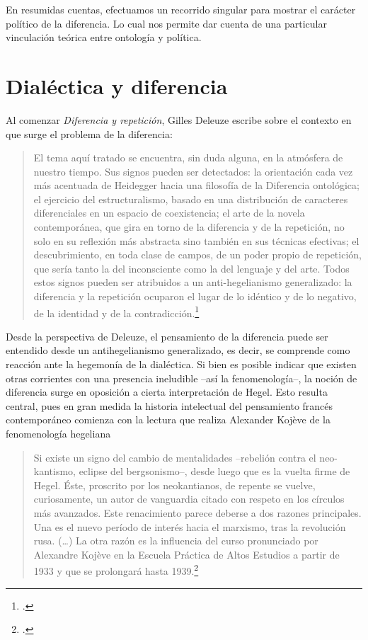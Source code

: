 En resumidas cuentas, efectuamos un recorrido singular para mostrar el
carácter político de la diferencia. Lo cual nos permite dar cuenta de
una particular vinculación teórica entre ontología y política.

\section{Dialéctica y diferencia}

Al comenzar \emph{Diferencia y repetición}, Gilles Deleuze escribe sobre
el contexto en que surge el problema de la diferencia:

\begin{quote}
El tema aquí tratado se encuentra, sin duda alguna, en la atmósfera de
nuestro tiempo. Sus signos pueden ser detectados: la orientación cada
vez más acentuada de Heidegger hacia una filosofía de la Diferencia
ontológica; el ejercicio del estructuralismo, basado en una distribución
de caracteres diferenciales en un espacio de coexistencia; el arte de la
novela contemporánea, que gira en torno de la diferencia y de la
repetición, no solo en su reflexión más abstracta sino también en sus
técnicas efectivas; el descubrimiento, en toda clase de campos, de un
poder propio de repetición, que sería tanto la del inconsciente como la
del lenguaje y del arte. Todos estos signos pueden ser atribuidos a un
anti-hegelianismo generalizado: la diferencia y la repetición ocuparon
el lugar de lo idéntico y de lo negativo, de la identidad y de la
contradicción.\footcite[15]{deleuze2002}
\end{quote}

Desde la perspectiva de Deleuze, el pensamiento de la diferencia puede
ser entendido desde un antihegelianismo generalizado, es decir, se
comprende como reacción ante la hegemonía de la dialéctica. Si bien es
posible indicar que existen otras corrientes con una presencia
ineludible --así la fenomenología--, la noción de diferencia surge en
oposición a cierta interpretación de Hegel. Esto resulta central, pues
en gran medida la historia intelectual del pensamiento francés
contemporáneo comienza con la lectura que realiza Alexander Kojève de la
fenomenología hegeliana

\begin{quote}
Si existe un signo del cambio de mentalidades --rebelión contra el
neo-kantismo, eclipse del bergsonismo--, desde luego que es la vuelta
firme de Hegel. Éste, proscrito por los neokantianos, de repente se
vuelve, curiosamente, un autor de vanguardia citado con respeto en los
círculos más avanzados. Este renacimiento parece deberse a dos razones
principales. Una es el nuevo período de interés hacia el marxismo, tras
la revolución rusa. (\dots) La otra razón es la influencia del
curso pronunciado por Alexandre Kojève en la Escuela Práctica de Altos
Estudios a partir de 1933 y que se prolongará hasta 1939.\footcite[28]{descombes1998}
\end{quote}

